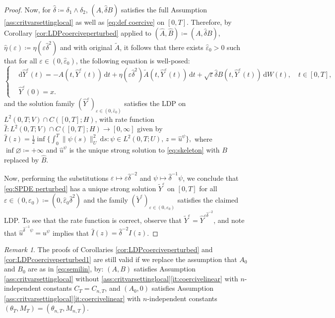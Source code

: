 \documentclass{amsart}
\newcommand{\dd}{\,\mathrm{d}}
\newcommand{\ddd}{\mathrm{d}}
\newcommand{\<}{\langle}
\newcommand{\?}{\rangle}
\newcommand{\ceqq}{\coloneqq}
\newcommand{\col}{\colon}
\theoremstyle{plain}
\theoremstyle{remark}
\newtheorem{remark}[theorem]{Remark}
\theoremstyle{plain}
\numberwithin{equation}{section}
\newcommand{\eps}{\varepsilon}
\begin{document}
\begin{proof}
Now, for $\hat{\delta} \ceqq \delta_1\wedge \delta_2$, $(A,\hat{\delta} B)$ satisfies the full Assumption \ref{ass:critvarsettinglocal} as well as \eqref{eq:def coercive} on $[0,T]$. 
Therefore, by Corollary \ref{cor:LDPcoerciveperturbed} applied to $(\hat{A},\hat{B})\ceqq (A,\hat{\delta}B)$, $\hat{\eta}(\eps)\ceqq \eta(\eps\hat{\delta}^2)$ and with original $\tilde{A}$, it follows that there exists $\hat{\eps}_0>0$ such that for all $\eps\in(0,\hat{\eps}_0)$, the following equation is well-posed:
\begin{equation*} 
\begin{cases}
  &\ddd \hat{Y}^\eps(t)=-A(t,\hat{Y}^\eps(t))\dd t+\eta(\eps\hat{\delta}^2)\tilde{A}(t,\hat{Y}^\eps(t))\dd t+\sqrt{\eps}\hat{\delta}B(t,\hat{Y}^\eps(t))\dd W(t), \quad t\in[0,T], \\
  &\hat{Y}^\eps(0)=x.
\end{cases}
\end{equation*}  
and the solution family $(\hat{Y}^\eps)_{\eps\in(0,\hat{\eps}_0)}$ satisfies the LDP on $L^2(0,T;V)\cap C([0,T];H)$, with rate function $\hat{I}\col L^2(0,T;V)\cap C([0,T];H)\to[0,\infty]$ given by $\hat{I}(z)=\frac{1}{2}\inf \{ \int_0^T \|\psi(s)\|_U^2\dd s : \psi\in L^2(0,T;U), \, z=\hat{u}^{\psi} \},$
where $\inf\varnothing\coloneqq +\infty$ and $\hat{u}^\psi$ is the unique strong solution to \eqref{eq:skeleton} with $B$ replaced by $\hat{B}$. 

Now, performing the substitutions $\eps\mapsto \eps\hat{\delta}^{-2}$ and $\psi\mapsto \hat{\delta}^{-1}\psi$, we conclude that \eqref{eq:SPDE perturbed} has a unique strong solution $\tilde{Y}^\eps$ on $[0,T]$ for all $\eps\in (0,\eps_0)\ceqq (0,\hat{\eps}_0\hat{\delta}^2)$ and the family $(\tilde{Y}^\eps)_{\eps\in(0,\eps_0)}$ satisfies the claimed LDP. To see that the rate function is correct, observe that  $\tilde{Y}^\eps=\hat{Y}^{\eps\hat{\delta}^{-2}}$, and note that $\hat{u}^{\hat{\delta}^{-1}\psi}=u^{\psi}$ implies that $\hat{I}(z)=\hat{\delta}^{-2}I(z)$. 
\end{proof}




\begin{remark}
The proofs of Corollaries \ref{cor:LDPcoerciveperturbed} and \ref{cor:LDPcoerciveperturbed1} are still valid if we replace the assumption that $A_0$ and $B_0$ are as in \eqref{eq:semilin}, by: $(A,B)$ satisfies Assumption \ref{ass:critvarsettinglocal} without  \ref{ass:critvarsettinglocal}\ref{it:coercivelinear} with $n$-independent constants $C_T=C_{n,T}$, and $(A_0,0)$ satisfies Assumption \ref{ass:critvarsettinglocal}\ref{it:coercivelinear}   with $n$-independent constants $(\theta_T,M_T)=(\theta_{n,T},M_{n,T})$. 
\end{remark}
\end{document}
